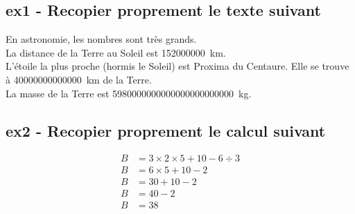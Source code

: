 \subsection*{ex1 - Recopier proprement le texte suivant}

En astronomie, les nombres sont très grands. \\
La distance de la Terre au Soleil est \SI{152 000 000}{\km}. \\
L'étoile la plus proche (hormis le Soleil) est Proxima du Centaure. Elle se trouve à \SI{40 000 000 000 000}{km} de la Terre.\\
La masse de la Terre est \SI{5 980 000 000 000 000 000 000 000}{kg}.

\subsection*{ex2 - Recopier proprement le calcul suivant }

\begin{align*}
    B &= 3 \times 2 \times 5 + 10 - 6 \div 3  \\
    B &= 6 \times 5 + 10 - 2\\
    B &= 30 + 10 - 2 \\
    B &= 40 - 2\\
    B &= 38\\  
\end{align*}


